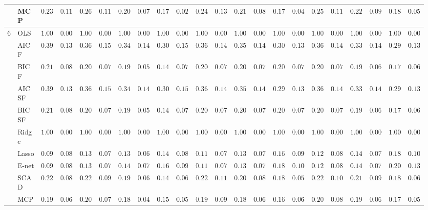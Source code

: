 \begin{tabular}{p{0.2cm}p{1cm}|p{0.6cm}p{0.6cm}|p{0.6cm}p{0.6cm}p{0.6cm}p{0.6cm}p{0.6cm}p{0.6cm}|p{0.6cm}p{0.6cm}p{0.6cm}p{0.6cm}p{0.6cm}p{0.6cm}|p{0.6cm}p{0.6cm}p{0.6cm}p{0.6cm}p{0.6cm}p{0.6cm}}
 & MCP  & $0.2383$ & $0.1142$ & $0.2633$ & $0.1189$ & $0.2017$ & $0.0722$ & $0.1700$ & $0.0235$ & $0.2483$ & $0.1371$ & $0.2150$ & $0.0831$ & $0.1783$ & $0.0427$ & $0.2500$ & $0.1173$ & $0.2200$ & $0.0914$ & $0.1833$ & $0.0503$ \\\hline
6 & OLS  & $1.0000$ & $0.0000$ & $1.0000$ & $0.0000$ & $1.0000$ & $0.0000$ & $1.0000$ & $0.0000$ & $1.0000$ & $0.0000$ & $1.0000$ & $0.0000$ & $1.0000$ & $0.0000$ & $1.0000$ & $0.0000$ & $1.0000$ & $0.0000$ & $1.0000$ & $0.0000$ \\
 & AIC F  & $0.3933$ & $0.1392$ & $0.3683$ & $0.1522$ & $0.3417$ & $0.1409$ & $0.3050$ & $0.1554$ & $0.3600$ & $0.1493$ & $0.3533$ & $0.1427$ & $0.3000$ & $0.1381$ & $0.3617$ & $0.1403$ & $0.3333$ & $0.1479$ & $0.2917$ & $0.1327$ \\
 & BIC F  & $0.2167$ & $0.0803$ & $0.2050$ & $0.0705$ & $0.1900$ & $0.0581$ & $0.1417$ & $0.0725$ & $0.2033$ & $0.0733$ & $0.2033$ & $0.0733$ & $0.2083$ & $0.0799$ & $0.2067$ & $0.0754$ & $0.1933$ & $0.0614$ & $0.1783$ & $0.0638$ \\
 & AIC SF  & $0.3900$ & $0.1365$ & $0.3683$ & $0.1522$ & $0.3433$ & $0.1418$ & $0.3017$ & $0.1548$ & $0.3600$ & $0.1493$ & $0.3517$ & $0.1419$ & $0.2967$ & $0.1393$ & $0.3633$ & $0.1409$ & $0.3317$ & $0.1470$ & $0.2917$ & $0.1327$ \\
 & BIC SF  & $0.2167$ & $0.0803$ & $0.2050$ & $0.0705$ & $0.1900$ & $0.0581$ & $0.1417$ & $0.0725$ & $0.2033$ & $0.0733$ & $0.2033$ & $0.0733$ & $0.2067$ & $0.0754$ & $0.2067$ & $0.0754$ & $0.1933$ & $0.0614$ & $0.1783$ & $0.0638$ \\
 & Ridge  & $1.0000$ & $0.0000$ & $1.0000$ & $0.0000$ & $1.0000$ & $0.0000$ & $1.0000$ & $0.0000$ & $1.0000$ & $0.0000$ & $1.0000$ & $0.0000$ & $1.0000$ & $0.0000$ & $1.0000$ & $0.0000$ & $1.0000$ & $0.0000$ & $1.0000$ & $0.0000$ \\
 & Lasso  & $0.0917$ & $0.0866$ & $0.1300$ & $0.0771$ & $0.1383$ & $0.0672$ & $0.1417$ & $0.0898$ & $0.1100$ & $0.0793$ & $0.1317$ & $0.0722$ & $0.1683$ & $0.0902$ & $0.1200$ & $0.0857$ & $0.1400$ & $0.0739$ & $0.1817$ & $0.1008$ \\
 & E-net  & $0.0900$ & $0.0868$ & $0.1300$ & $0.0771$ & $0.1433$ & $0.0750$ & $0.1600$ & $0.0945$ & $0.1100$ & $0.0793$ & $0.1317$ & $0.0722$ & $0.1850$ & $0.1083$ & $0.1200$ & $0.0857$ & $0.1400$ & $0.0739$ & $0.2083$ & $0.1306$ \\
 & SCAD  & $0.2200$ & $0.0883$ & $0.2267$ & $0.0903$ & $0.1950$ & $0.0672$ & $0.1450$ & $0.0655$ & $0.2217$ & $0.1186$ & $0.2067$ & $0.0890$ & $0.1833$ & $0.0556$ & $0.2250$ & $0.1043$ & $0.2117$ & $0.0943$ & $0.1817$ & $0.0631$ \\
 & MCP  & $0.1967$ & $0.0686$ & $0.2017$ & $0.0796$ & $0.1817$ & $0.0479$ & $0.1550$ & $0.0592$ & $0.1983$ & $0.0908$ & $0.1850$ & $0.0622$ & $0.1617$ & $0.0602$ & $0.2067$ & $0.0858$ & $0.1950$ & $0.0672$ & $0.1733$ & $0.0576$ \\
\hline 
\end{tabular}

